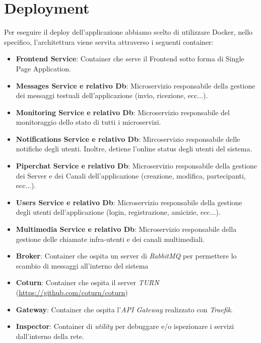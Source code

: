\section{Deployment}



Per eseguire il deploy dell'applicazione abbiamo scelto di utilizzare Docker, nello specifico, l'architettura viene servita attraverso i seguenti container:

\begin{itemize}
    \item \textbf{Frontend Service}: Container che serve il Frontend sotto forma di Single Page Application.

    \item \textbf{Messages Service e relativo Db}: Microservizio responsabile della gestione dei messaggi testuali dell'applicazione (invio, ricezione, ecc...).

    \item \textbf{Monitoring Service e relativo Db}: Microservizio responsabile del monitoraggio dello stato di tutti i microservizi.

    \item \textbf{Notifications Service e relativo Db}: Mircoservizio responsabile delle notifiche degli utenti. Inoltre, detiene l'online status degli utenti del sistema.

    \item \textbf{Piperchat Service e relativo Db}: Microservizio responsabile della gestione dei Server e dei Canali dell'applicazione (creazione, modifica, partecipanti, ecc...).

    \item \textbf{Users Service e relativo Db}: Microservizio responsabile della gestione degli utenti dell'applicazione (login, registrazione, amicizie, ecc...).

    \item \textbf{Multimedia Service e relativo Db}: Microservizio responsabile della gestione delle chiamate infra-utenti e dei canali multimediali.

    \item \textbf{Broker}: Container che ospita un server di \emph{RabbitMQ} per permettere lo scambio di messaggi all'interno del sistema

    \item \textbf{Coturn}: Container che ospita il server \emph{TURN} (\url{https://github.com/coturn/coturn})

    \item \textbf{Gateway}: Container che ospita l'\emph{API Gateway} realizzato con \emph{Traefik}. 

    \item \textbf{Inspector}: Container di \emph{utility} per debuggare e/o ispezionare i servizi dall'interno della rete.
\end{itemize}

